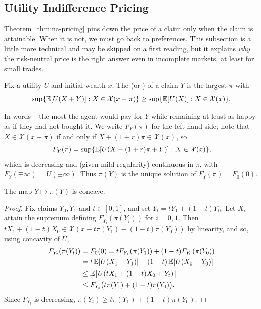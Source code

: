 \documentclass[a4paper]{scrartcl}
\begin{document}
\subsection{Utility Indifference Pricing}

Theorem~\ref{thm:na-pricing} pins down the price of a claim only when the claim is attainable. When it is not, we must go back to preferences. This subsection is a little more technical and may be skipped on a first reading, but it explains \emph{why} the risk-neutral price is the right answer even in incomplete markets, at least for small trades.

\begin{definition}
	Fix a utility $U$ and initial wealth $x$. The  (or ) of a claim $Y$ is the largest $\pi$ with
	$$
	\sup\{\mathbb{E}[U(X+Y)] : X \in \mathcal{X}(x - \pi)\} \geq \sup\{\mathbb{E}[U(X)] : X \in \mathcal{X}(x)\}.
	$$
\end{definition}

In words -- the most the agent would pay for $Y$ while remaining at least as happy as if they had not bought it. We write $F_Y(\pi)$ for the left-hand side; note that $X \in \mathcal{X}(x-\pi)$ if and only if $X + (1+r)\pi \in \mathcal{X}(x)$, so
$$
F_Y(\pi) = \sup\{\mathbb{E}[U(X - (1+r)\pi + Y)] : X \in \mathcal{X}(x)\},
$$
which is decreasing and (given mild regularity) continuous in $\pi$, with $F_Y(\mp\infty) = U(\pm\infty)$. Thus $\pi(Y)$ is the unique solution of $F_Y(\pi) = F_0(0)$.

\begin{theorem}
	The map $Y \mapsto \pi(Y)$ is concave.
\end{theorem}

\begin{proof}
	Fix claims $Y_0, Y_1$ and $t \in [0,1]$, and set $Y_t = tY_1 + (1-t)Y_0$. Let $X_i$ attain the supremum defining $F_{Y_i}(\pi(Y_i))$ for $i = 0,1$. Then $tX_1 + (1-t)X_0 \in \mathcal{X}(x - t\pi(Y_1) - (1-t)\pi(Y_0))$ by linearity, and so, using concavity of $U$,
	\begin{align*}
		F_{Y_t}(\pi(Y_t)) &= F_0(0) = tF_{Y_1}(\pi(Y_1)) + (1-t)F_{Y_0}(\pi(Y_0))\\
		&= t\,\mathbb{E}[U(X_1 + Y_1)] + (1-t)\,\mathbb{E}[U(X_0+Y_0)]\\
		&\leq \mathbb{E}\big[U(tX_1 + (1-t)X_0 + Y_t)\big]\\
		&\leq F_{Y_t}\big(t\pi(Y_1) + (1-t)\pi(Y_0)\big).
	\end{align*}
	Since $F_{Y_t}$ is decreasing, $\pi(Y_t) \geq t\pi(Y_1) + (1-t)\pi(Y_0)$.
\end{proof}
\end{document}

